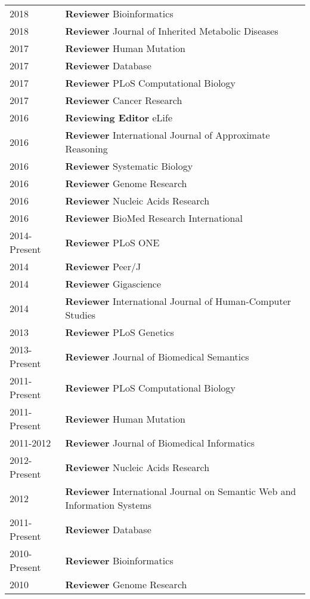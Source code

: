 \documentclass[11pt,fullpage]{article}
\begin{document}
\begin{longtable}{p{0.5in}|p{5.5in}}

  2018 & \textbf{Reviewer} Bioinformatics \\
  2018 & \textbf{Reviewer} Journal of Inherited Metabolic Diseases \\
  2017 & \textbf{Reviewer} Human Mutation \\
  2017 & \textbf{Reviewer} Database \\
  2017 & \textbf{Reviewer} PLoS Computational Biology \\
  2017 & \textbf{Reviewer} Cancer Research \\
  2016 & \textbf{Reviewing Editor} eLife \\
  2016 & \textbf{Reviewer} International Journal of Approximate Reasoning \\
  2016 & \textbf{Reviewer} Systematic Biology \\
  2016 & \textbf{Reviewer} Genome Research \\
  2016 & \textbf{Reviewer} Nucleic Acids Research \\
  2016 & \textbf{Reviewer} BioMed Research International \\
  2014-Present & \textbf{Reviewer} PLoS ONE \\
  2014 & \textbf{Reviewer} Peer/J \\
  2014 & \textbf{Reviewer} Gigascience \\
  2014 & \textbf{Reviewer} International Journal of Human-Computer Studies \\
  2013 & \textbf{Reviewer} PLoS Genetics \\
  2013-Present & \textbf{Reviewer} Journal of Biomedical Semantics \\
  2011-Present & \textbf{Reviewer} PLoS Computational Biology \\
  2011-Present & \textbf{Reviewer} Human Mutation \\
  2011-2012 & \textbf{Reviewer} Journal of Biomedical Informatics \\
  2012-Present & \textbf{Reviewer} Nucleic Acids Research \\
  2012 &  \textbf{Reviewer} International Journal on Semantic Web and Information Systems \\
  2011-Present & \textbf{Reviewer} Database \\
  2010-Present & \textbf{Reviewer} Bioinformatics \\
  2010 & \textbf{Reviewer} Genome Research \\


\end{longtable}
\end{document}
